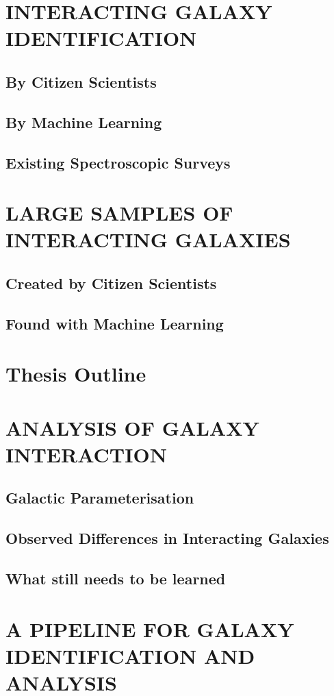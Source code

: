 \section{INTERACTING GALAXY IDENTIFICATION}

\subsection{By Citizen Scientists}

\subsection{By Machine Learning}

\subsection{Existing Spectroscopic Surveys}


\section{LARGE SAMPLES OF INTERACTING GALAXIES}
\subsection{Created by Citizen Scientists}
\subsection{Found with Machine Learning}
\section{Thesis Outline}

\section{ANALYSIS OF GALAXY INTERACTION}
\subsection{Galactic Parameterisation}
\subsection{Observed Differences in Interacting Galaxies}
\subsection{What still needs to be learned}

\section{A PIPELINE FOR GALAXY IDENTIFICATION AND ANALYSIS}